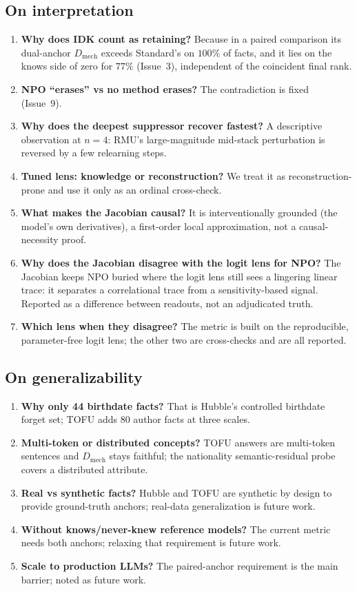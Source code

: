 \documentclass[11pt,a4paper]{article}
\newcommand{\dmech}{\ensuremath{D_{\text{mech}}}}
\begin{document}
\subsection*{On interpretation}
\begin{enumerate}[label=\arabic*.,start=22]
\item \textbf{Why does IDK count as retaining?} Because in a paired comparison its dual-anchor \dmech{}
exceeds Standard's on $100\%$ of facts, and it lies on the knows side of zero for $77\%$ (Issue~3),
independent of the coincident final rank.
\item \textbf{NPO ``erases'' vs no method erases?} The contradiction is fixed (Issue~9).
\item \textbf{Why does the deepest suppressor recover fastest?} A descriptive observation at $n=4$: RMU's
large-magnitude mid-stack perturbation is reversed by a few relearning steps.
\item \textbf{Tuned lens: knowledge or reconstruction?} We treat it as reconstruction-prone and use it only
as an ordinal cross-check.
\item \textbf{What makes the Jacobian causal?} It is interventionally grounded (the model's own
derivatives), a first-order local approximation, not a causal-necessity proof.
\item \textbf{Why does the Jacobian disagree with the logit lens for NPO?} The Jacobian keeps NPO buried
where the logit lens still sees a lingering linear trace: it separates a correlational trace from a
sensitivity-based signal. Reported as a difference between readouts, not an adjudicated truth.
\item \textbf{Which lens when they disagree?} The metric is built on the reproducible, parameter-free logit
lens; the other two are cross-checks and are all reported.
\end{enumerate}

\subsection*{On generalizability}
\begin{enumerate}[label=\arabic*.,start=29]
\item \textbf{Why only 44 birthdate facts?} That is Hubble's controlled birthdate forget set; TOFU adds
$80$ author facts at three scales.
\item \textbf{Multi-token or distributed concepts?} TOFU answers are multi-token sentences and \dmech{}
stays faithful; the nationality semantic-residual probe covers a distributed attribute.
\item \textbf{Real vs synthetic facts?} Hubble and TOFU are synthetic by design to provide ground-truth
anchors; real-data generalization is future work.
\item \textbf{Without knows/never-knew reference models?} The current metric needs both anchors; relaxing
that requirement is future work.
\item \textbf{Scale to production LLMs?} The paired-anchor requirement is the main barrier; noted as future
work.
\end{enumerate}
\end{document}
